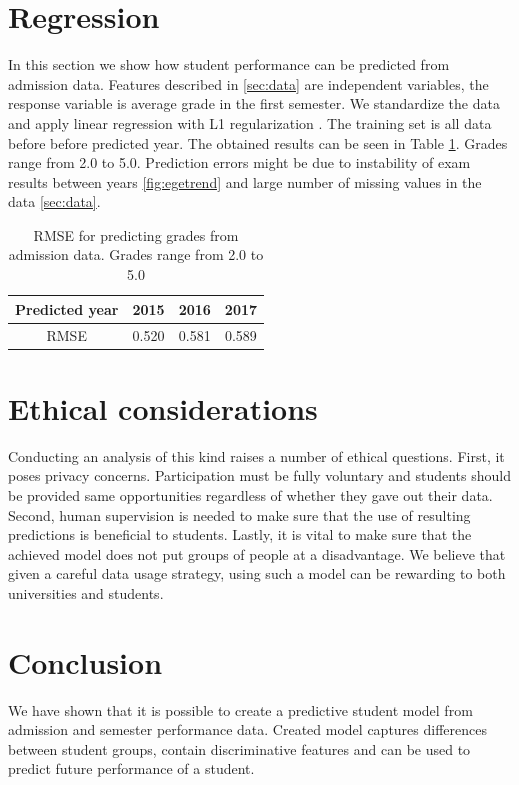 \documentclass{article}
\begin{document}
\section{Regression}
In this section we show how student performance can be predicted from admission data. Features described in \ref{sec:data} are independent variables, the response variable is average grade in the first semester. We standardize the data and apply linear regression with L1 regularization \cite{lasso}. The training set is all data before before predicted year. The obtained results can be seen in Table \ref{table_regression}. Grades range from 2.0 to 5.0. Prediction errors might be due to instability of exam results between years \ref{fig:egetrend} and large number of missing values in the data \ref{sec:data}.

\begin{table}[h!]
  \captionsetup{justification=centering}
  \centering
  \caption{RMSE for predicting grades from admission data. Grades range from 2.0 to 5.0}
  \begin{tabular}{ |c||c|c|c| }
    \hline
    Predicted year & 2015  & 2016  & 2017  \\
    \hline
    RMSE           & 0.520 & 0.581 & 0.589 \\
    \hline
  \end{tabular}
  \label{table_regression}
\end{table}

\section{Ethical considerations}
Conducting an analysis of this kind raises a number of  ethical questions. First, it poses privacy concerns. Participation must be fully voluntary and students should be provided same opportunities regardless of whether they gave out their data. Second, human supervision is needed to make sure that the use of resulting predictions is beneficial to students. Lastly, it is vital to make sure that the achieved model does not put groups of people at a disadvantage.
We believe that given a careful data usage strategy, using such a model can be rewarding to both universities and students.

\section{Conclusion}
We have shown that it is possible to create a predictive student model from admission and semester performance data. Created model captures differences between student groups, contain discriminative features and can be used to predict future performance of a student.


\end{document}
